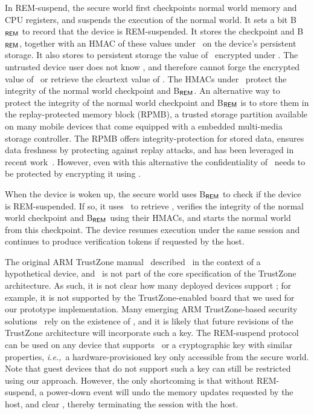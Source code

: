 \documentclass[pageno]{sig-alternate-05-2015}
\newcommand{\ie}{\textit{i.e.,}}
\newcommand{\addtext}[2]{#2}
\begin{document}
In REM-suspend, the secure world first checkpoints normal world memory and CPU
registers, and suspends the execution of the normal world. It sets a bit
\textsf{B$_{\sf REM}$} to record that the device is REM-suspended. It stores
the checkpoint and \textsf{B$_{\sf REM}$}, together with an HMAC of these
values under \ks\ on the device's persistent storage. It also stores to
persistent storage the value of \ks\ encrypted under \kdev.  The untrusted
device user does not know \kdev, and therefore cannot forge the encrypted value
of \ks\ or retrieve the cleartext value of \ks. The HMACs under \ks\ protect
the integrity of the normal world checkpoint and \textsf{B$_{\sf REM}$}.
\addtext{Task 6}{An alternative way to protect the integrity of the normal
world checkpoint and \textsf{B$_{\sf REM}$} is to store them in the
replay-protected memory block (RPMB), a trusted storage partition available on
many mobile devices that come equipped with a embedded multi-media storage
controller. The RPMB offers integrity-protection for stored data, ensures data
freshness by protecting against replay attacks, and has been leveraged in
recent work~\cite{ftpm:msrtr}. However, even with this alternative the
confidentiality of \ks\ needs to be protected by encrypting it using \kdev.}

When the device is woken up, the secure world uses \textsf{B$_{\sf REM}$} to
check if the device is REM-suspended. If so, it uses \kdev\ to retrieve \ks,
verifies the integrity of the normal world checkpoint and \textsf{B$_{\sf
REM}$} using their HMACs, and starts the normal world from this checkpoint.
The device resumes execution under the same session and continues to
produce verification tokens if requested by the host.

\addtext{Task 6}{The original ARM TrustZone manual~\cite{armtz} described
\kdev\ in the context of a hypothetical device, and \kdev\ is not part of the
core specification of the TrustZone architecture. As such, it is not clear how
many deployed devices support \kdev; for example, it is not supported by the
TrustZone-enabled board that we used for our prototype implementation.  Many
emerging ARM TrustZone-based security
solutions~\cite{tlr:asplos14,sentry:asplos15,ftpm:msrtr} rely on the existence
of \kdev, and it is likely that future revisions of the TrustZone architecture
will incorporate such a key. The REM-suspend protocol can be used on any
device that supports \kdev\ or a cryptographic key with similar properties,
\ie~a hardware-provisioned key only accessible from the secure world. 
Note that guest devices that do not support such a key can still be
restricted using our approach. However, the only shortcoming is that without
REM-suspend, a power-down event will undo the memory updates requested by the
host, and clear \ks, thereby terminating the session with the host.}
\end{document}
